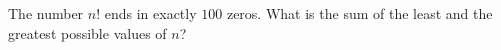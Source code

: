 The number $n!$ ends in exactly $100$ zeros. What is the sum of the least and the greatest possible values of $n$?
